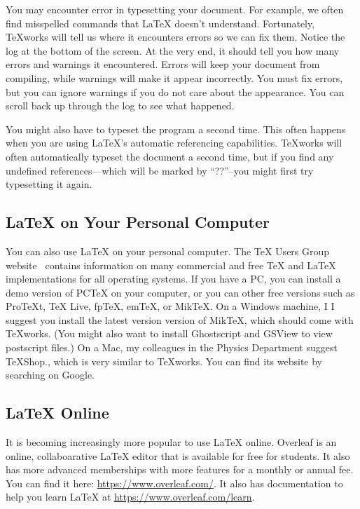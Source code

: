 \documentclass[titlepage]{article}                %
\theoremstyle{definition}
\theoremstyle{remark}
\begin{document}
You may encounter error in typesetting your document.  For example, we often
find misspelled commands that \LaTeX{} doesn't understand.  Fortunately,
TeXworks will tell us where it encounters errors so we can fix them.
Notice the log at the bottom of the screen.  At the very end, it should tell
you how many errors and warnings it encountered.  Errors will keep your
document from compiling, while warnings will make it appear incorrectly.  You
must fix errors, but you can ignore warnings if you do not care about the
appearance.  You can scroll back up through the log to see what happened.

You might also have to typeset the program a second time.  This often happens
when you are using \LaTeX{}'s automatic referencing capabilities.
TeXworks will often automatically typeset the document a second time, but if you find any undefined references---which will be marked by ``??''--you might first try typesetting it again.

\subsection{\LaTeX{} on Your Personal Computer}

You can also use \LaTeX{} on your personal computer.  The \TeX{} Users Group
website~\cite{tug} contains information on many commercial and free \TeX{} and
\LaTeX{} implementations for all operating systems.  If you have a PC, you can
install a demo version of PCTeX on your computer, or you can other free
versions such as ProTeXt, TeX Live, fpTeX, emTeX, or MikTeX.  On a Windows machine, I I suggest you install the latest version version of MikTeX, which should come with TeXworks.  (You might also want to install Ghostscript and GSView to view postscript files.)  On a Mac, my
colleagues in the Physics Department suggest TeXShop., which is very similar to TeXworks.  You can find its
website by searching on Google.

\subsection{\LaTeX{} Online}

It is becoming increasingly more popular to use \LaTeX{} online.  Overleaf is an online, collaboarative \LaTeX{} editor that is available for free for students.  It also has more advanced memberships with more features for a monthly or annual fee.  You can find it here: \url{https://www.overleaf.com/}.  It also has documentation to help you learn \LaTeX{} at \url{https://www.overleaf.com/learn}.
\end{document}
